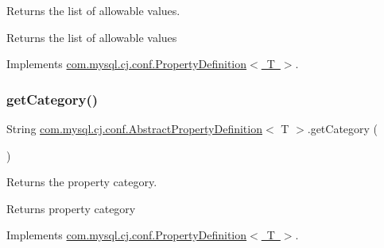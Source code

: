 Returns the list of allowable values.

\begin{DoxyReturn}{Returns}
the list of allowable values 
\end{DoxyReturn}


Implements \mbox{\hyperlink{interfacecom_1_1mysql_1_1cj_1_1conf_1_1_property_definition_af0b3b3dc66dde20cb65b69eb2ec70738}{com.\+mysql.\+cj.\+conf.\+Property\+Definition$<$ T $>$}}.

\mbox{\label{classcom_1_1mysql_1_1cj_1_1conf_1_1_abstract_property_definition_a42152845862ecc58cab2f76ff8359e5c}} 
\subsubsection{\texorpdfstring{get\+Category()}{getCategory()}}
{\footnotesize\ttfamily String \mbox{\hyperlink{classcom_1_1mysql_1_1cj_1_1conf_1_1_abstract_property_definition}{com.\+mysql.\+cj.\+conf.\+Abstract\+Property\+Definition}}$<$ T $>$.get\+Category (\begin{DoxyParamCaption}{ }\end{DoxyParamCaption})}

Returns the property category.

\begin{DoxyReturn}{Returns}
property category 
\end{DoxyReturn}


Implements \mbox{\hyperlink{interfacecom_1_1mysql_1_1cj_1_1conf_1_1_property_definition_a3def2907e92eb8015dcbe406d3a55a24}{com.\+mysql.\+cj.\+conf.\+Property\+Definition$<$ T $>$}}.

\mbox{\label{classcom_1_1mysql_1_1cj_1_1conf_1_1_abstract_property_definition_af42f8fd9bb3feef2843558105b4246a1}} 
